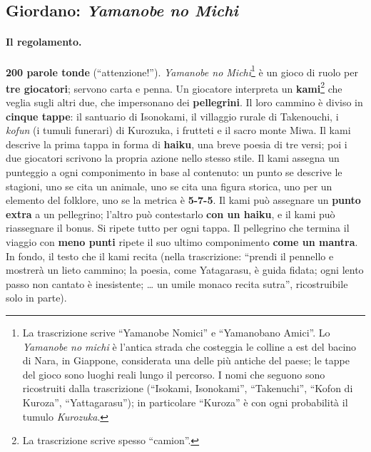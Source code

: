 \subsection{Giordano: \emph{Yamanobe no Michi}}
\label{a6:sec:yamanobe}

\paragraph{Il regolamento.} \textbf{200 parole tonde} (``attenzione!''). \emph{Yamanobe
no Michi}\footnote{La trascrizione scrive ``Yamanobe Nomici'' e ``Yamanobano
Amici''. Lo \emph{Yamanobe no michi} è l'antica strada che costeggia le colline a est
del bacino di Nara, in Giappone, considerata una delle più antiche del paese; le tappe
del gioco sono luoghi reali lungo il percorso. I nomi che seguono sono ricostruiti
dalla trascrizione (``Isokami, Isonokami'', ``Takenuchi'', ``Kofon di Kuroza'',
``Yattagarasu''); in particolare ``Kuroza'' è con ogni probabilità il tumulo
\emph{Kurozuka}.} è un gioco di ruolo per \textbf{tre giocatori}; servono carta e
penna. Un giocatore interpreta un \textbf{kami}\footnote{La trascrizione scrive
spesso ``camion''.} che veglia sugli altri due, che impersonano dei
\textbf{pellegrini}. Il loro cammino è diviso in \textbf{cinque tappe}: il santuario
di Isonokami, il villaggio rurale di Takenouchi, i \emph{kofun} (i tumuli funerari)
di Kurozuka, i frutteti e il sacro monte Miwa. Il kami descrive la prima tappa in
forma di \textbf{haiku}, una breve poesia di tre versi; poi i due giocatori scrivono la
propria azione nello stesso stile. Il kami assegna un punteggio a ogni componimento in
base al contenuto: un punto se descrive le stagioni, uno se cita un animale, uno se
cita una figura storica, uno per un elemento del folklore, uno se la metrica è
\textbf{5-7-5}. Il kami può assegnare un \textbf{punto extra} a un pellegrino; l'altro
può contestarlo \textbf{con un haiku}, e il kami può riassegnare il bonus. Si ripete
tutto per ogni tappa. Il pellegrino che termina il viaggio con \textbf{meno punti}
ripete il suo ultimo componimento \textbf{come un mantra}. In fondo, il testo che il
kami recita (nella trascrizione: ``prendi il pennello e mostrerà un lieto cammino; la
poesia, come Yatagarasu, è guida fidata; ogni lento passo non cantato è inesistente;
\ldots{} un umile monaco recita sutra'', ricostruibile solo in parte).

